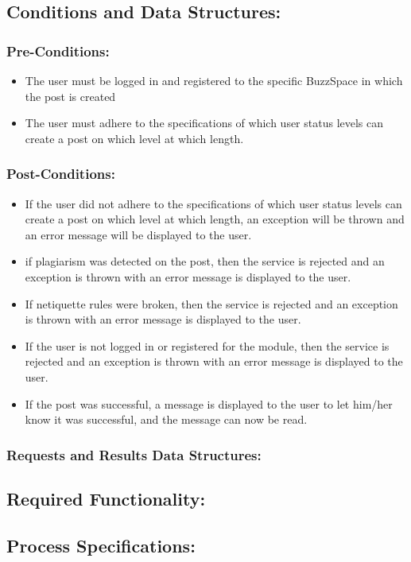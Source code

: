 \documentclass[a4paper,11pt]{article}
\begin{document}
\subsection{Conditions and Data Structures:}
\subsubsection*{Pre-Conditions:}
\begin{itemize}
	\item The user must be logged in and registered to the specific BuzzSpace in which the post is created
	\item The user must adhere to the specifications of which user status levels can create a post on which level at which length.
\end{itemize}
\subsubsection*{Post-Conditions:}
\begin{itemize}
	\item If the user did not adhere to the specifications of which user status levels can create a post on which level at which length, an exception will be thrown and an error
	message will be displayed to the user.
	\item if plagiarism was detected on the post, then the service is rejected and an exception is thrown with an error message is displayed to the user.
	\item If netiquette rules were broken,  then the service is rejected and an exception is thrown with an error message is displayed to the user.
	\item If the user is not logged in or registered for the module, then the service is rejected and an exception is thrown with an error message is displayed to the user.
	\item If the post was successful, a message is displayed to the user to let him/her know it was successful, and the message can now be read.
\end{itemize}
\subsubsection*{Requests and Results Data Structures:}
\subsection{Required Functionality:} 
\subsection{Process Specifications:} 
\end{document}
